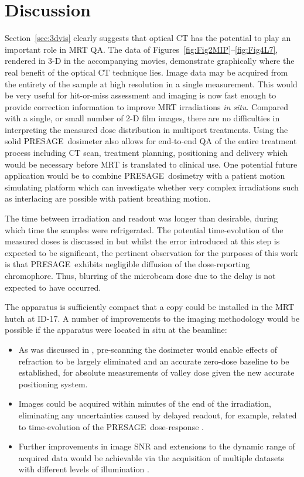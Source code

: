 	\section{Discussion}
	Section~\ref{sec:3dvis} clearly suggests that optical CT has the potential to play an important role in MRT QA. The data of Figures~\ref{fig:Fig2MIP}--\ref{fig:Fig4L7}, rendered in 3-D in the accompanying movies, demonstrate graphically where the real benefit of the optical CT technique lies. Image data may be acquired from the entirety of the sample at high resolution in a single measurement. This would be very useful for hit-or-miss assessment and imaging is now fast enough to provide correction information to improve MRT irradiations \textit{in situ}. Compared with a single, or small number of 2-D film images, there are no difficulties in interpreting the measured dose distribution in multiport treatments. Using the solid PRESAGE\textregistered \ dosimeter also allows for end-to-end QA of the entire treatment process including CT scan, treatment planning, positioning and delivery which would be necessary before MRT is translated to clinical use. One potential future application would be to combine PRESAGE\textregistered \ dosimetry with a patient motion simulating platform which can investigate whether very complex irradiations such as interlacing are possible with patient breathing motion. 
	
	The time between irradiation and readout was longer than desirable, during which time the samples were refrigerated. The potential time-evolution of the measured doses is discussed in \cite{doranestablishing2013} but whilst the error introduced at this step is expected to be significant, the pertinent observation for the purposes of this work is that PRESAGE\textregistered \ exhibits negligible diffusion of the dose-reporting chromophore. Thus, blurring of the microbeam dose due to the delay is not expected to have occurred.
	
	The apparatus is sufficiently compact that a copy could be installed in the MRT hutch at ID-17. A number of improvements to the imaging methodology would be possible if the apparatus were located in situ at the beamline:
	\begin{itemize}
		\item As was discussed in \cite{doranestablishing2013}, pre-scanning the dosimeter would enable effects of refraction to be largely eliminated and an accurate zero-dose baseline to be established, for absolute measurements of valley dose given the new accurate positioning system.
		\item Images could be acquired within minutes of the end of the irradiation, eliminating any uncertainties caused by delayed readout, for example, related to time-evolution of the PRESAGE\textregistered \ dose-response \cite{skyttemperature2011 , skyttemperature2012}.   
		\item Further improvements in image SNR and extensions to the dynamic range of acquired data would be achievable via the acquisition of multiple datasets with different levels of illumination \cite{krstajiccharacterization2007 , thomasa2011}.
	\end{itemize}
	
